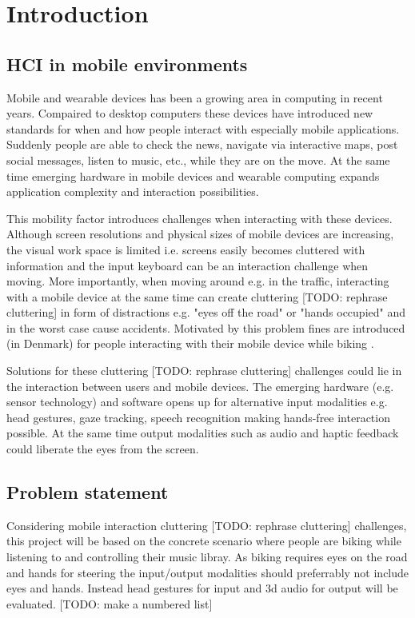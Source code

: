 \chapter{Introduction}
\section{HCI in mobile environments}
Mobile and wearable devices has been a growing area in computing in recent years. Compaired to desktop computers these devices have introduced new standards for when and how people interact with especially mobile applications. Suddenly people are able to check the news, navigate via interactive maps, post social messages, listen to music, etc., while they are on the move. At the same time emerging hardware in mobile devices and wearable computing expands application complexity and interaction possibilities.

This mobility factor introduces challenges when interacting with these devices. Although screen resolutions and physical sizes of mobile devices are increasing, the visual work space is limited i.e. screens easily becomes cluttered with information and the input keyboard can be an interaction challenge when moving. More importantly, when moving around e.g. in the traffic, interacting with a mobile device at the same time can create cluttering [TODO: rephrase cluttering] in form of distractions e.g. "eyes off the road" or "hands occupied" and in the worst case cause accidents. Motivated by this problem fines are introduced (in Denmark) for people interacting with their mobile device while biking \cite{cyklistforbundet_bodetakster_2014}.

Solutions for these cluttering [TODO: rephrase cluttering] challenges could lie in the interaction between users and mobile devices. The emerging hardware (e.g. sensor technology) and software opens up for alternative input modalities e.g. head gestures, gaze tracking, speech recognition making hands-free interaction possible. At the same time output modalities such as audio and haptic feedback could liberate the eyes from the screen.

\section{Problem statement}
Considering mobile interaction cluttering [TODO: rephrase cluttering] challenges, this project will be based on the concrete scenario where people are biking while listening to and controlling their music libray. As biking requires eyes on the road and hands for steering the input/output modalities should preferrably not include eyes and hands. Instead head gestures for input and 3d audio for output will be evaluated. [TODO: make a numbered list]

